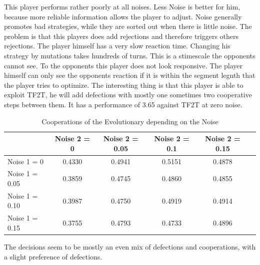 This player performs rather poorly at all noises. Less Noise is better for him, because more reliable information allows the player to adjust. Noise generally promotes bad strategies, while they are sorted out when there is little noise. The problem is that this players does add rejections and therefore triggers others rejections. The player himself has a very slow reaction time. Changing his strategy by mutations takes hundreds of turns. This is a stimescale the opponents cannot see. To the opponents this player does not look responsive. The player himself can only see the opponents reaction if it is within the segment legnth that the player tries to optimize. The interesting thing is that this player is able to exploit TF2T, he will add defections with mostly one sometimes two cooperative steps between them. It has a performance of 3.65 against TF2T at zero noise.

\begin{table}[h]
 \begin{center}
\caption{Cooperations of the Evolutionary depending on the Noise} \vspace{3mm}
\begin{tabular}{|l|c|c|c|c|c|}
\hline
   	& Noise 2 = 0 & Noise 2 = 0.05& Noise 2 = 0.1& Noise 2 = 0.15 \\
  \hline
  Noise 1 = 0 	&         0.4330 & 0.4941  &  0.5151  &  0.4878 \\
 \hline
  Noise 1 = 0.05	 &          0.3859   & 0.4745 &   0.4860 &   0.4855\\
 \hline
  Noise 1 = 0.10 	&    0.3987 &   0.4750&    0.4919&    0.4914 \\
 \hline
  Noise 1 = 0.15 	&     0.3755 &   0.4793  &  0.4733  &  0.4896 \\
 \hline
\end{tabular}
 \end{center}
\end{table}

The decisions seem to be mostly an even mix of defections and cooperations, with a slight preference of defections.


\newpage
